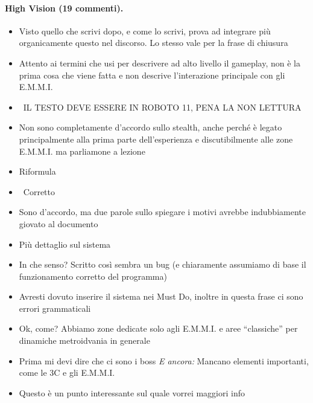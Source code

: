 \paragraph{High Vision (19 commenti).}
{\small
\begin{itemize}
  \item {} Visto quello che scrivi dopo, e come lo scrivi, prova ad integrare più organicamente questo nel discorso. Lo stesso vale per la frase di chiusura
  \item {} Attento ai termini che usi per descrivere ad alto livello il gameplay, non è la prima cosa che viene fatta e non descrive l'interazione principale con gli E.M.M.I.
  \item {} \rvAvviso\ IL TESTO DEVE ESSERE IN ROBOTO 11, PENA LA NON LETTURA
  \item {} Non sono completamente d'accordo sullo stealth, anche perché è legato principalmente alla prima parte dell'esperienza e discutibilmente alle zone E.M.M.I. ma parliamone a lezione
  \item {} Riformula
  \item {} \rvBene\ Corretto
  \item {} Sono d'accordo, ma due parole sullo spiegare i motivi avrebbe indubbiamente giovato al documento
  \item {} Più dettaglio sul sistema
  \item {} In che senso? Scritto così sembra un bug (e chiaramente assumiamo di base il funzionamento corretto del programma)
  \item {} Avresti dovuto inserire il sistema nei Must Do, inoltre in questa frase ci sono errori grammaticali
  \item {} Ok, come? Abbiamo zone dedicate solo agli E.M.M.I. e aree ``classiche'' per dinamiche metroidvania in generale
  \item {} Prima mi devi dire che ci sono i boss \emph{E ancora:} Mancano elementi importanti, come le 3C e gli E.M.M.I.
  \item {} Questo è un punto interessante sul quale vorrei maggiori info

\end{itemize}}
